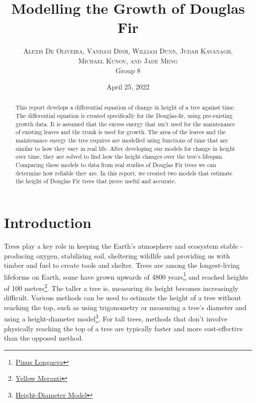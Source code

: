 \documentclass[twocolumn]{article} %
\title{Modelling the Growth of Douglas Fir} %
\author{%
\textsc{Alexis De Oliveira, Vandam Dinh, William Dunn, Judah Kavanagh,} \\[1ex] %
\textsc{Michael Kunov, and Jade Meng} \\
\normalsize Group 8 \\ %
}
\date{April 25, 2022} %
\begin{document}

\maketitle




\begin{abstract}
This report develops a differential equation of change in height of a tree against time. The differential equation is created specifically for the Douglas-fir, using pre-existing growth data. It is assumed that the excess energy that isn’t used for the maintenance of existing leaves and the trunk is used for growth. The area of the leaves and the maintenance energy the tree requires are modelled using functions of time that are similar to how they vary in real life. After developing our models for change in height over time, they are solved to find how the height changes over the tree’s lifespan. Comparing these models to data from real studies of Douglas Fir trees we can determine how reliable they are. In this report, we created two models that estimate the height of Douglas Fir trees that prove useful and accurate.
\end{abstract}



\section{Introduction}

Trees play a key role in keeping the Earth’s atmosphere and ecosystem stable - producing oxygen, stabilising soil, sheltering wildlife and providing us with timber and fuel to create tools and shelter. Trees are among the longest-living lifeforms on Earth, some have grown upwards of 4800 years\footnote{\href{https://www.conifers.org/pi/Pinus_longaeva.php}{Pinus Longaeva}} and reached heights of 100 meters\footnote{\href{https://www.frontiersin.org/articles/10.3389/ffgc.2019.00032/full}{Yellow Meranti}}. The taller a tree is, measuring its height becomes increasingly difficult. Various methods can be used to estimate the height of a tree without reaching the top, such as using trigonometry or measuring a tree’s diameter and using a height-diameter model\footnote{\href{https://annforsci.biomedcentral.com/articles/10.1007/s13595-016-0611-0}{Height-Diameter Model}}. For tall trees, methods that don’t involve physically reaching the top of a tree are typically faster and more cost-effective than the opposed method.
\end{document}
